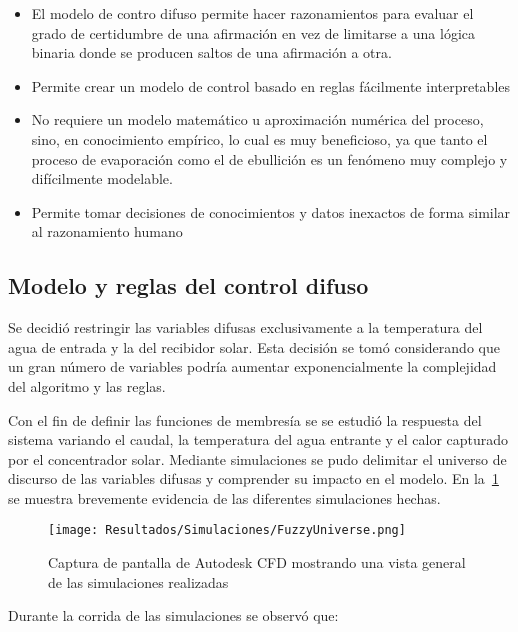 			\begin{itemize}
				\item El modelo de contro difuso permite hacer razonamientos para evaluar el grado de certidumbre de una afirmación en vez de limitarse a una lógica binaria donde se producen saltos de una afirmación a otra.
				\item Permite crear un modelo de control basado en reglas fácilmente interpretables
				\item No requiere un modelo matemático u aproximación numérica del proceso, sino, en conocimiento empírico, lo cual es muy beneficioso, ya que tanto el proceso de evaporación como el de ebullición es un fenómeno muy complejo y difícilmente modelable.
				\item Permite tomar decisiones de conocimientos y datos inexactos de forma similar al razonamiento humano
			\end{itemize}		
		
		\subsection{Modelo y reglas del control difuso}
				
			Se decidió restringir las variables difusas exclusivamente a la temperatura del agua de entrada y la del recibidor solar. Esta decisión se tomó considerando que un gran número de variables podría aumentar exponencialmente la complejidad del algoritmo y las reglas.
			
			Con el fin de definir las funciones de membresía se se estudió la respuesta del sistema  variando el caudal, la temperatura del agua entrante y el calor capturado por el concentrador solar. Mediante simulaciones se pudo delimitar el universo de discurso de las variables difusas y comprender su impacto en el modelo.	En la~\cref{fig:FuzzyUniverse} se muestra brevemente evidencia de las diferentes simulaciones hechas.
								
			\begin{figure}[H]
				\centering
				\texttt{[image: Resultados/Simulaciones/FuzzyUniverse.png]}
				\caption{Captura de pantalla de Autodesk CFD mostrando una vista general de las simulaciones realizadas}
				\label{fig:FuzzyUniverse}
			\end{figure}
			
			Durante la corrida de las simulaciones se observó que:
			
